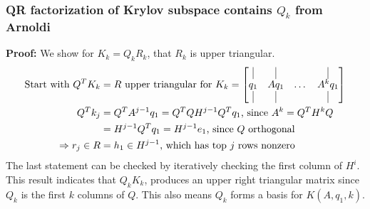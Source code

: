 \documentclass{article}
\begin{document}
\subsubsection{QR factorization of Krylov subspace contains $Q_k$ from Arnoldi}
\textbf{Proof:} We show for $K_k = Q_kR_k$, that $R_k$ is upper triangular.
\begin{align*}
    \textrm{Start with } Q^TK_k &= R \textrm{ upper triangular for } K_k = \begin{bmatrix}
        \vline & \vline & & \vline \\ q_1 & Aq_1& \dots & A^kq_1 \\ \vline & \vline & & \vline \end{bmatrix}\\
        Q^Tk_j &= Q^TA^{j-1}q_1 = Q^T Q H^{j-1} Q^T q_1 \textrm{, since } A^k = Q^T H^k Q\\
        &= H^{j-1} Q^T q_1 = H^{j-1} e_1 \textrm{, since $Q$ orthogonal}\\
        \Rightarrow r_j \in R &= h_1 \in H^{j-1} \textrm{, which has top $j$ rows nonzero}
\end{align*}
The last statement can be checked by iteratively checking the first column of $H^i$. This result indicates that $Q_kK_k$, produces an upper right triangular matrix since $Q_k$ is the first $k$ columns of $Q$. This also means $Q_k$ forms a basis for $K(A, q_1, k)$.
\end{document}
